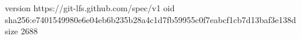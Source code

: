 version https://git-lfs.github.com/spec/v1
oid sha256:e7401549980e6e04eb6b235b28a4c1d7fb59955c0f7eabcf1cb7d13baf3e138d
size 2688
